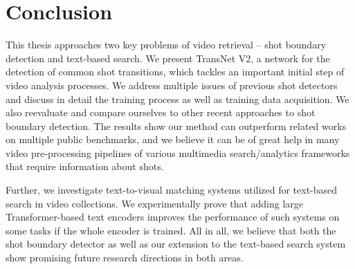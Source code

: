 \chapter*{Conclusion}

This thesis approaches two key problems of video retrieval -- shot boundary detection and text-based search. 
We present TransNet V2, a network for the detection of common shot transitions, which tackles an important initial step of video analysis processes.
We address multiple issues of previous shot detectors and discuss in detail the training process as well as training data acquisition. We also reevaluate and compare ourselves to other recent approaches to shot boundary detection. The results show our method can outperform related works on multiple public benchmarks, and we believe it can be of great help in many video pre-processing pipelines of various multimedia search/analytics frameworks that require information about shots.

Further, we investigate text-to-visual matching systems utilized for text-based search in video collections. We experimentally prove that adding large Trans\-former-based text encoders improves the performance of such systems on some tasks if the whole encoder is trained.
All in all, we believe that both the shot boundary detector as well as our extension to the text-based search system show promising future research directions in both areas.
